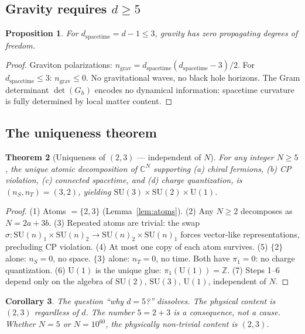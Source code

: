 \documentclass[12pt]{article}
\newtheorem{theorem}{Theorem}[section]
\newtheorem{corollary}[theorem]{Corollary}
\newtheorem{proposition}[theorem]{Proposition}
\theoremstyle{remark}
\theoremstyle{definition}
\begin{document}
\subsection{Gravity requires $d \geq 5$}

\begin{proposition}
For $d_\text{spacetime} = d - 1 \leq 3$, gravity has zero propagating degrees of freedom.
\end{proposition}

\begin{proof}
Graviton polarizations: $n_\text{grav} = d_\text{spacetime}(d_\text{spacetime} - 3)/2$. For $d_\text{spacetime} \leq 3$: $n_\text{grav} \leq 0$. No gravitational waves, no black hole horizons. The Gram determinant $\det(G_h)$ encodes no dynamical information: spacetime curvature is fully determined by local matter content.
\end{proof}

\subsection{The uniqueness theorem}

\begin{theorem}[Uniqueness of $(2,3)$ --- independent of $N$]
\label{thm:d5}
For any integer $N \geq 5$, the unique atomic decomposition of $\mathbb{C}^N$ supporting (a) chiral fermions, (b) CP violation, (c) connected spacetime, and (d) charge quantization, is $(n_S, n_T) = (3, 2)$, yielding $\text{SU}(3) \times \text{SU}(2) \times \text{U}(1)$.
\end{theorem}

\begin{proof}
(1) Atoms $= \{2, 3\}$ (Lemma~\ref{lem:atoms}). (2) Any $N \geq 2$ decomposes as $N = 2a + 3b$. (3) Repeated atoms are trivial: the swap $\sigma: \text{SU}(n)_1 \times \text{SU}(n)_2 \to \text{SU}(n)_2 \times \text{SU}(n)_1$ forces vector-like representations, precluding CP violation. (4) At most one copy of each atom survives. (5) $\{2\}$ alone: $n_S = 0$, no space. $\{3\}$ alone: $n_T = 0$, no time. Both have $\pi_1 = 0$: no charge quantization. (6) $\text{U}(1)$ is the unique glue: $\pi_1(\text{U}(1)) = \mathbb{Z}$. (7) Steps 1--6 depend only on the algebra of $\text{SU}(2)$, $\text{SU}(3)$, $\text{U}(1)$, independent of $N$.
\end{proof}

\begin{corollary}
The question ``why $d = 5$?'' dissolves. The physical content is $(2, 3)$ regardless of $d$. The number $5 = 2 + 3$ is a consequence, not a cause. Whether $N = 5$ or $N = 10^{60}$, the physically non-trivial content is $(2, 3)$.
\end{corollary}
\end{document}

